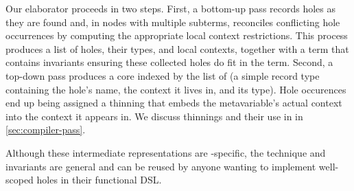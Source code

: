 Our elaborator proceeds in two steps.
%
First, a bottom-up pass records holes as they are found and, in nodes with multiple subterms, reconciles conflicting hole occurrences by computing the appropriate local context restrictions.
%
This process produces a list of holes, their types, and local contexts,
together with a  term that contains invariants ensuring
these collected holes do fit in the term.
%
Second, a top-down pass produces a core  indexed by the list of  (a simple record type containing the hole's name, the context it lives in, and its type).
%
Hole occurences end up being assigned a thinning that embeds the metavariable's actual context into the context it appears in.
We discuss thinnings and their use in \Velo{} in \ref{sec:compiler-pass}.

Although these intermediate representations are \Velo{}-specific, the technique
and invariants are general and can be reused by anyone wanting to implement
well-scoped holes in their functional DSL.

